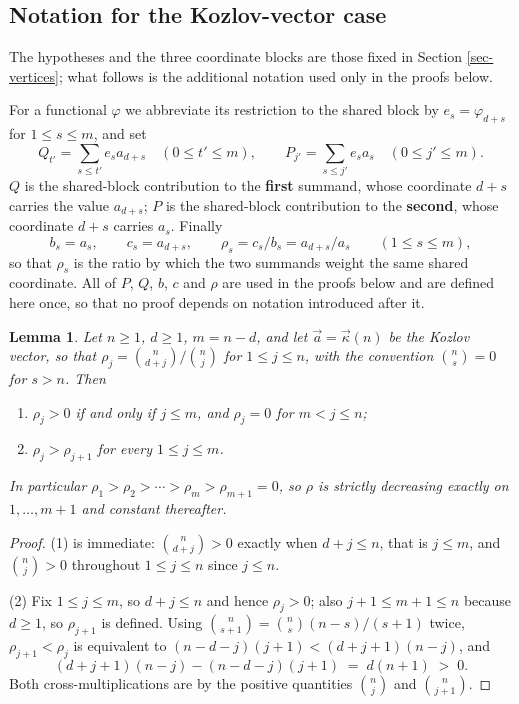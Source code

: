 \documentclass[11pt, a4paper, abstract=yes]{scrartcl}
\theoremstyle{definition}
\theoremstyle{remark}
\theoremstyle{plain}
\newtheorem{lemma}[definition]{Lemma}
\newcommand{\kozvec}{\vec\kappa}
\newcommand{\leandiscof}[1]{\tikz[baseline=-0.6ex]\fill[#1] (0,0) circle (0.6ex);}
\newcommand{\leanfull}{\leandiscof{leanfull}}
\newcommand{\leanmark}[1]{\leavevmode{\reversemarginpar\marginnote{\raggedleft#1}}}
\begin{document}
\subsection{Notation for the Kozlov-vector case}
\label{sec-app-koznot}
The hypotheses and the three coordinate blocks are those fixed in Section \ref{sec-vertices}; what
follows is the additional notation used only in the proofs below.

For a functional \(\varphi\) we abbreviate its restriction to the shared block by
\(e_s=\varphi_{d+s}\) for \(1\le s\le m\), and set
\begin{equation}\label{eq:PQ}
  Q_{t'}=\sum_{s\le t'}e_sa_{d+s}\quad(0\le t'\le m),\qquad
  P_{j'}=\sum_{s\le j'}e_sa_{s}\quad(0\le j'\le m).
\end{equation}
\(Q\) is the shared-block contribution to the \textbf{first} summand, whose coordinate \(d+s\) carries the
value \(a_{d+s}\); \(P\) is the shared-block contribution to the \textbf{second}, whose coordinate \(d+s\)
carries \(a_s\). Finally
\begin{equation}\label{eq:digraph}
  b_s=a_s,\qquad c_s=a_{d+s},\qquad \rho_s=c_s/b_s=a_{d+s}/a_s\qquad(1\le s\le m),
\end{equation}
so that \(\rho_s\) is the ratio by which the two summands weight the same shared coordinate. All of
\(P\), \(Q\), \(b\), \(c\) and \(\rho\) are used in the proofs below and are defined here once, so
that no proof depends on notation introduced after it.

\begin{lemma}
\leanmark{\leanfull}Let \(n\ge1\), \(d\ge1\), \(m=n-d\), and let \(\vec a=\kozvec(n)\) be the Kozlov vector, so that
\(\rho_j=\binom n{d+j}\big/\binom nj\) for \(1\le j\le n\), with the convention
\(\binom ns=0\) for \(s>n\). Then
\begin{enumerate}
\item \(\rho_j>0\) if and only if \(j\le m\), and \(\rho_j=0\) for \(m<j\le n\);
\item \(\rho_j>\rho_{j+1}\) for every \(1\le j\le m\).
\end{enumerate}
In particular \(\rho_1>\rho_2>\cdots>\rho_m>\rho_{m+1}=0\), so \(\rho\) is strictly decreasing
exactly on \(1,\dots,m+1\) and constant thereafter.
\label{lem:binomial-ratio}
\label{lem-binomial-ratio}
\end{lemma}

\begin{proof}
(1) is immediate: \(\binom n{d+j}>0\) exactly when \(d+j\le n\), that is \(j\le m\), and
\(\binom nj>0\) throughout \(1\le j\le n\) since \(j\le n\).

(2) Fix \(1\le j\le m\), so \(d+j\le n\) and hence \(\rho_j>0\); also \(j+1\le m+1\le n\) because
\(d\ge1\), so \(\rho_{j+1}\) is defined. Using \(\binom n{s+1}=\binom ns(n-s)/(s+1)\) twice,
\(\rho_{j+1}<\rho_j\) is equivalent to \((n-d-j)(j+1)<(d+j+1)(n-j)\), and
\begin{equation}\label{eq:binomial-ratio}
  (d+j+1)(n-j)-(n-d-j)(j+1)\;=\;d(n+1)\;>\;0 .
\end{equation}
Both cross-multiplications are by the positive quantities \(\binom nj\) and \(\binom n{j+1}\).
\end{proof}
\end{document}
